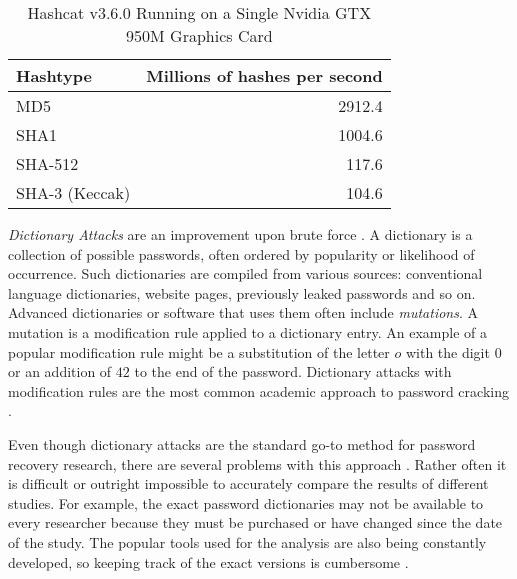 \begin{table}
    \begin{center}
        \begin{tabular}{lr}
            Hashtype & Millions of hashes per second \\
            \hline
            MD5 & 2912.4 \\
            SHA1 & 1004.6 \\
            SHA-512 & 117.6 \\
            SHA-3 (Keccak) & 104.6
        \end{tabular}
    \end{center}
    \caption{Hashcat v3.6.0 Running on a Single Nvidia GTX 950M Graphics Card}
    \label{table:hashcat-speed}
\end{table}

\emph{Dictionary Attacks} are an improvement upon brute force \cite{narayanan:2005:fast}. A dictionary is a collection of possible passwords, often ordered by popularity or likelihood of occurrence. Such dictionaries are compiled from various sources: conventional language dictionaries, website pages, previously leaked passwords and so on. Advanced dictionaries or software that uses them often include \emph{mutations}. A mutation is a modification rule applied to a dictionary entry. An example of a popular modification rule might be a substitution of the letter \(o\) with the digit \(0\) or an addition of \(42\) to the end of the password. Dictionary attacks with modification rules are the most common academic approach to password cracking \cite{zhang2010security, weir2010testing, kelley2012guess, shay2010encountering}.

Even though dictionary attacks are the standard go-to method for password recovery research, there are several problems with this approach \cite{bonneau:2012:the-science-of-guessing}. Rather often it is difficult or outright impossible to accurately compare the results of different studies. For example, the exact password dictionaries may not be available to every researcher because they must be purchased or have changed since the date of the study. The popular tools used for the analysis are also being constantly developed, so keeping track of the exact versions is cumbersome \cite{bonneau:2012:the-science-of-guessing}.

